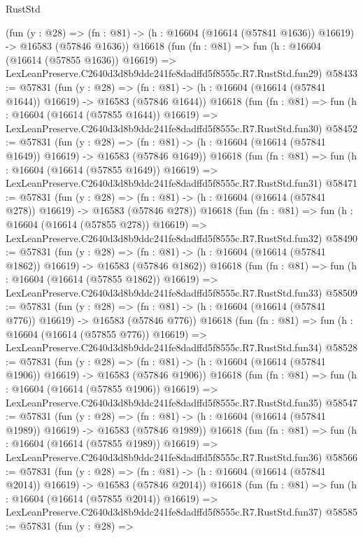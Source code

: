 \begin{lexlean}{RustStd}
\begin{coremodule}
    (fun (y : @28) =>
    (fn : @81) -> (h : @16604 (@16614 (@57841 @1636)) @16619) -> @16583 (@57846 @1636))
    @16618
    (fun (fn : @81) =>
    fun (h : @16604 (@16614 (@57855 @1636)) @16619) =>
    LexLeanPreserve.C2640d3d8b9ddc241fe8dadffd5f8555c.R7.RustStd.fun29)
@58433 := @57831
    (fun (y : @28) =>
    (fn : @81) -> (h : @16604 (@16614 (@57841 @1644)) @16619) -> @16583 (@57846 @1644))
    @16618
    (fun (fn : @81) =>
    fun (h : @16604 (@16614 (@57855 @1644)) @16619) =>
    LexLeanPreserve.C2640d3d8b9ddc241fe8dadffd5f8555c.R7.RustStd.fun30)
@58452 := @57831
    (fun (y : @28) =>
    (fn : @81) -> (h : @16604 (@16614 (@57841 @1649)) @16619) -> @16583 (@57846 @1649))
    @16618
    (fun (fn : @81) =>
    fun (h : @16604 (@16614 (@57855 @1649)) @16619) =>
    LexLeanPreserve.C2640d3d8b9ddc241fe8dadffd5f8555c.R7.RustStd.fun31)
@58471 := @57831
    (fun (y : @28) =>
    (fn : @81) -> (h : @16604 (@16614 (@57841 @278)) @16619) -> @16583 (@57846 @278))
    @16618
    (fun (fn : @81) =>
    fun (h : @16604 (@16614 (@57855 @278)) @16619) =>
    LexLeanPreserve.C2640d3d8b9ddc241fe8dadffd5f8555c.R7.RustStd.fun32)
@58490 := @57831
    (fun (y : @28) =>
    (fn : @81) -> (h : @16604 (@16614 (@57841 @1862)) @16619) -> @16583 (@57846 @1862))
    @16618
    (fun (fn : @81) =>
    fun (h : @16604 (@16614 (@57855 @1862)) @16619) =>
    LexLeanPreserve.C2640d3d8b9ddc241fe8dadffd5f8555c.R7.RustStd.fun33)
@58509 := @57831
    (fun (y : @28) =>
    (fn : @81) -> (h : @16604 (@16614 (@57841 @776)) @16619) -> @16583 (@57846 @776))
    @16618
    (fun (fn : @81) =>
    fun (h : @16604 (@16614 (@57855 @776)) @16619) =>
    LexLeanPreserve.C2640d3d8b9ddc241fe8dadffd5f8555c.R7.RustStd.fun34)
@58528 := @57831
    (fun (y : @28) =>
    (fn : @81) -> (h : @16604 (@16614 (@57841 @1906)) @16619) -> @16583 (@57846 @1906))
    @16618
    (fun (fn : @81) =>
    fun (h : @16604 (@16614 (@57855 @1906)) @16619) =>
    LexLeanPreserve.C2640d3d8b9ddc241fe8dadffd5f8555c.R7.RustStd.fun35)
@58547 := @57831
    (fun (y : @28) =>
    (fn : @81) -> (h : @16604 (@16614 (@57841 @1989)) @16619) -> @16583 (@57846 @1989))
    @16618
    (fun (fn : @81) =>
    fun (h : @16604 (@16614 (@57855 @1989)) @16619) =>
    LexLeanPreserve.C2640d3d8b9ddc241fe8dadffd5f8555c.R7.RustStd.fun36)
@58566 := @57831
    (fun (y : @28) =>
    (fn : @81) -> (h : @16604 (@16614 (@57841 @2014)) @16619) -> @16583 (@57846 @2014))
    @16618
    (fun (fn : @81) =>
    fun (h : @16604 (@16614 (@57855 @2014)) @16619) =>
    LexLeanPreserve.C2640d3d8b9ddc241fe8dadffd5f8555c.R7.RustStd.fun37)
@58585 := @57831
    (fun (y : @28) =>

\end{coremodule}
\end{lexlean}
